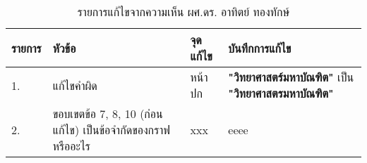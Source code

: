 \begin{table}[ht!]
    \caption{รายการแก้ไขจากความเห็น ผศ.ดร. อาทิตย์ ทองทักษ์}
    \centering
    \begin{tabularx}{\textwidth}{|l|l|l|X|}
        \hline
        \rowcolor{LightGray} 
        {\bf รายการ}    & {\bf หัวข้อ}                            & {\bf จุดแก้ไข}          & {\bf บันทึกการแก้ไข} \\ \hline
        1.              & แก้ไขคำผิด                              & หน้าปก                 & {\bf "วิทยาศาสตร์มหาบัณฑิต"} เป็น {\bf "วิทยาศาสตรมหาบัณฑิต"} \\ \hline
        2.              & ขอบเขตข้อ 7, 8, 10 (ก่อนแก้ไข) เป็นข้อจำกัดของกราฟหรืออะไร      & xxx                   & eeee \\ \hline
    \end{tabularx}
\end{table}
